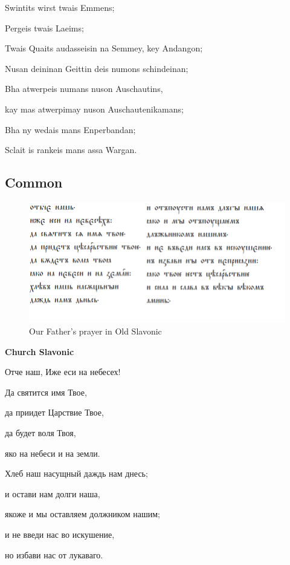 Swintits wirst twais Emmens;

Pergeis twais Laeims;

Twais Quaits audasseisin na Semmey, key Andangon;

Nusan deininan Geittin deis numons schindeinan;

Bha atwerpeis numans nuson Auschautins,

kay mas atwerpimay nuson Auschautenikamans;

Bha ny wedais mans Enperbandan;

Sclait is rankeis mans assa Wargan.

\subsection{Common}

\begin{figure}
	\includegraphics[width=\linewidth]{./sources/of-old-slav.png}
	\caption{Our Father's prayer in Old Slavonic}
	\label{fig:of-old-slav}
\end{figure}

\textbf{Church Slavonic}

Отче наш, Иже еси на небесех!

Да святится имя Твое,

да приидет Царствие Твое,

да будет воля Твоя,

яко на небеси и на земли.

Хлеб наш насущный даждь нам днесь;

и остави нам долги наша,

якоже и мы оставляем должником нашим;

и не введи нас во искушение,

но избави нас от лукаваго.

